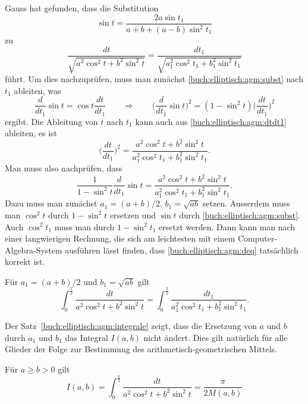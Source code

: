 Gauss hat gefunden, dass die Substitution
\begin{equation}
\sin t
=
\frac{2a\sin t_1}{a+b+(a-b)\sin^2 t_1}
\label{buch:elliptisch:agm:subst}
\end{equation}
zu
\begin{equation}
\frac{dt}{\sqrt{a^2_{\phantom{1}}\cos^2 t + b^2_{\phantom{1}} \sin^2 t}}
=
\frac{dt_1}{\sqrt{a_1^2\cos^2 t_1 + b_1^2 \sin^2 t_1}}
\label{buch:elliptisch:agm:dtdt1}
\end{equation}
führt.
Um dies nachzuprüfen, muss man zunächst
\eqref{buch:elliptisch:agm:subst}
nach $t_1$ ableiten, was
\[
\frac{d}{dt_1}\sin t
=
\cos t
\frac{dt}{dt_1}
\qquad\Rightarrow\qquad
\biggl(
\frac{d}{dt_1}\sin t
\biggr)^2
=
(1-\sin^2t)\biggl(\frac{dt}{dt_1}\biggr)^2
\]
ergibt.
Die Ableitung von $t$ nach $t_1$ kann auch aus
\eqref{buch:elliptisch:agm:dtdt1}
ableiten, es ist
\[
\biggl(
\frac{dt}{dt_1}
\biggr)^2
=
\frac{a^2_{\phantom{1}} \cos^2 t + b^2_{\phantom{1}} \sin^2 t}{a_1^2 \cos^2 t_1 + b_1^2 \sin^2 t_1}.
\]
Man muss also nachprüfen, dass
\begin{equation}
\frac{1}{1-\sin^2 t}
\frac{d}{dt_1}\sin t
=
\frac{a^2 \cos^2 t + b^2 \sin^2 t}{a_1^2 \cos^2 t_1 + b_1^2 \sin^2 t_1}.
\label{buch:elliptisch:agm:deq}
\end{equation}
Dazu muss man zunächst $a_1=(a+b)/2$, $b_1=\!\sqrt{ab}$ setzen.
Ausserdem muss man $\cos^2 t$ durch $1-\sin^2t$ ersetzen und
$\sin t$ durch \eqref{buch:elliptisch:agm:subst}.
Auch $\cos^2 t_1$ muss man durch $1-\sin^2t_1$ ersetzt werden.
Dann kann man nach einer langwierigen Rechnung, die sich am leichtesten
mit einem Computer-Algebra-System ausführen lässt finden, dass
\eqref{buch:elliptisch:agm:deq}
tatsächlich korrekt ist.

\begin{satz}
%
\label{buch:elliptisch:agm:integrale}
Für $a_1=(a+b)/2$ und $b_1=\sqrt{ab}$ gilt
\[
\int_0^{\frac{\pi}2}
\frac{dt}{a^2\cos^2 t + b^2 \sin^2 t}
=
\int_0^{\frac{\pi}2}
\frac{dt_1}{a_1^2\cos^2 t_1 + b_1^2 \sin^2 t_1}.
\]
\end{satz}

Der Satz~\ref{buch:elliptisch:agm:integrale} zeigt, dass die Ersetzung
von $a$ und $b$ durch $a_1$ und $b_1$ das Integral $I(a,b)$ nicht ändert.
Dies gilt natürlich für alle Glieder der Folge zur Bestimmung des
arithmetisch-geometrischen Mittels.

\begin{satz}
%
Für $a\ge b>0$ gilt
\begin{equation}
I(a,b)
=
\int_0^{\frac{\pi}2}
\frac{dt}{a^2\cos^2 t + b^2\sin^2t}
=
\frac{\pi}{2M(a,b)}
\end{equation}
\end{satz}


